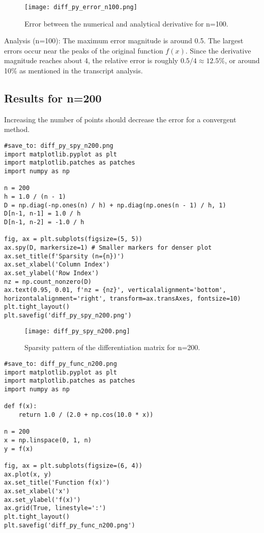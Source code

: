 \documentclass{article}
\begin{document}
\begin{figure}[H]
\centering
\texttt{[image: diff\_py\_error\_n100.png]}
\caption{Error between the numerical and analytical derivative for n=100.}
\label{fig:diff_py_error_n100}
\end{figure}

Analysis (n=100): The maximum error magnitude is around 0.5. The largest errors occur near the peaks of the original function $f(x)$. Since the derivative magnitude reaches about 4, the relative error is roughly $0.5 / 4 \approx 12.5\%$, or around 10\% as mentioned in the transcript analysis.

\subsection{Results for n=200}
Increasing the number of points should decrease the error for a convergent method.

\begin{verbatim}
#save_to: diff_py_spy_n200.png
import matplotlib.pyplot as plt
import matplotlib.patches as patches
import numpy as np

n = 200
h = 1.0 / (n - 1)
D = np.diag(-np.ones(n) / h) + np.diag(np.ones(n - 1) / h, 1)
D[n-1, n-1] = 1.0 / h
D[n-1, n-2] = -1.0 / h

fig, ax = plt.subplots(figsize=(5, 5))
ax.spy(D, markersize=1) # Smaller markers for denser plot
ax.set_title(f'Sparsity (n={n})')
ax.set_xlabel('Column Index')
ax.set_ylabel('Row Index')
nz = np.count_nonzero(D)
ax.text(0.95, 0.01, f'nz = {nz}', verticalalignment='bottom', horizontalalignment='right', transform=ax.transAxes, fontsize=10)
plt.tight_layout()
plt.savefig('diff_py_spy_n200.png')
\end{verbatim}

\begin{figure}[H]
\centering
\texttt{[image: diff\_py\_spy\_n200.png]}
\caption{Sparsity pattern of the differentiation matrix for n=200.}
\label{fig:diff_py_spy_n200}
\end{figure}


\begin{verbatim}
#save_to: diff_py_func_n200.png
import matplotlib.pyplot as plt
import matplotlib.patches as patches
import numpy as np

def f(x):
    return 1.0 / (2.0 + np.cos(10.0 * x))

n = 200
x = np.linspace(0, 1, n)
y = f(x)

fig, ax = plt.subplots(figsize=(6, 4))
ax.plot(x, y)
ax.set_title('Function f(x)')
ax.set_xlabel('x')
ax.set_ylabel('f(x)')
ax.grid(True, linestyle=':')
plt.tight_layout()
plt.savefig('diff_py_func_n200.png')
\end{verbatim}
\end{document}
